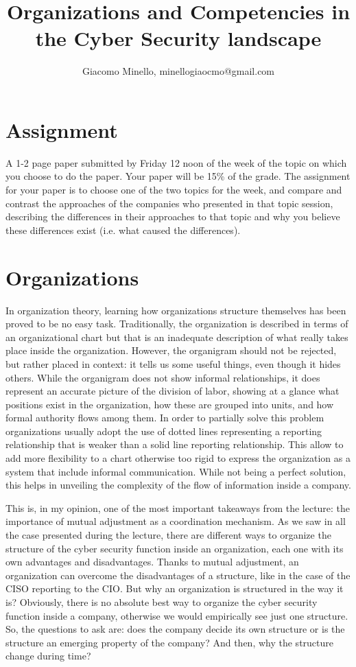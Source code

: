 \documentclass[a4paper, 10pt, conference]{ieeeconf}      %
\title{\LARGE \bf
Organizations and Competencies in the Cyber Security landscape
}
\author{Giacomo Minello, minellogiaocmo@gmail.com%
}
\begin{document}
\maketitle
\thispagestyle{empty}
\pagestyle{empty}


\section*{Assignment}
 A 1-2 page paper submitted by Friday 12 noon of the week of the topic on which you choose to do the paper. Your paper will be 15\% of the grade. The assignment for your paper is to choose one of the two topics for the week, and compare and contrast the approaches of the companies who presented in that topic session, describing the differences in their approaches to that topic and why you believe these differences exist (i.e. what caused the differences). 
\section{Organizations}
In organization theory, learning how organizations structure themselves has been proved to be no easy task. Traditionally, the organization is described in terms of an organizational chart but that is an inadequate description of what really takes place inside the organization. However, the organigram should not be rejected, but rather placed in context: it tells us some useful things, even though it hides others. While the organigram does not show informal relationships, it does represent an accurate picture of the division of labor, showing at a glance what positions exist in the organization, how these are grouped into units, and how formal authority flows among them. In order to partially solve this problem organizations usually adopt the use of dotted lines representing a reporting relationship that is weaker than a solid line reporting relationship. This allow to add more flexibility to a chart otherwise too rigid to express the organization as a system that include informal communication. While not being a perfect solution, this helps in unveiling the complexity of the flow of information inside a company. 

This is, in my opinion, one of the most important takeaways from the lecture: the importance of mutual adjustment as a coordination mechanism. As we saw in all the case presented during the lecture, there are different ways to organize the structure of the cyber security function inside an organization, each one with its own advantages and disadvantages. Thanks to mutual adjustment, an organization can overcome the disadvantages of a structure, like in the case of the CISO reporting to the CIO. But why an organization is structured in the way it is? Obviously, there is no absolute best way to organize the cyber security function inside a company, otherwise we would empirically see just one structure. So, the questions to ask are: does the company decide its own structure or is the structure an emerging property of the company? And then, why the structure change during time? 
\end{document}
